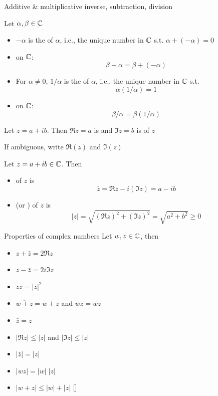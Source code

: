 \documentclass[aspectratio=169]{beamer}
\begin{document}
\begin{frame}{Additive \& multiplicative inverse, subtraction, division}
\begin{definition}
Let $\alpha,\beta\in\mathbb{C}$
\begin{itemize}
\item $-\alpha$ is the  of $\alpha$, i.e., the unique number in $\mathbb{C}$ s.t. $\alpha+(-\alpha)=0$
\item {} on $\mathbb{C}$:
\[
\beta-\alpha=\beta+(-\alpha)
\]
\item For $\alpha\neq 0$, $1/\alpha$ is the  of $\alpha$, i.e., the unique number in $\mathbb{C}$ s.t.
\[
\alpha(1/\alpha)=1
\]
\item {} on $\mathbb{C}$:
\[
\beta/\alpha=\beta(1/\alpha)
\]
\end{itemize}
\end{definition}
\end{frame}


\begin{frame}
\begin{definition}
Let $z=a+ib$. Then $\Re z=a$ is  and $\Im z=b$ is  of $z$
\end{definition}
If ambiguous, write $\Re(z)$ and $\Im(z)$
\begin{definition}
Let $z=a+ib\in\mathbb{C}$. Then
\begin{itemize}
\item {} of $z$ is
\[
\bar z=\Re z-i(\Im z) = a-ib
\]
\item {} (or ) of $z$ is
\[
|z|=\sqrt{\left(\Re z\right)^2+\left(\Im z\right)^2} = \sqrt{a^2+b^2} \geq 0
\]
\end{itemize}
\end{definition}
\end{frame}

\begin{frame}{Properties of complex numbers}
Let $w,z\in\mathbb{C}$, then
\begin{itemize}
\item $z+\bar z=2\Re z$
\item $z-\bar z=2i\Im z$
\item $z\bar z=|z|^2$
\item $\overline{w+z}=\bar w+\bar z$ and $\overline{wz}=\bar w\bar z$
\item $\overline{\bar z}=z$
\item $|\Re z|\leq |z|$ and $|\Im z|\leq |z|$
\item $|\bar z|=|z|$
\item $|wz|=|w|\;|z|$
\item $|w+z|\leq |w|+|z|$ \hfill[]
\end{itemize}
\end{frame}
\end{document}
